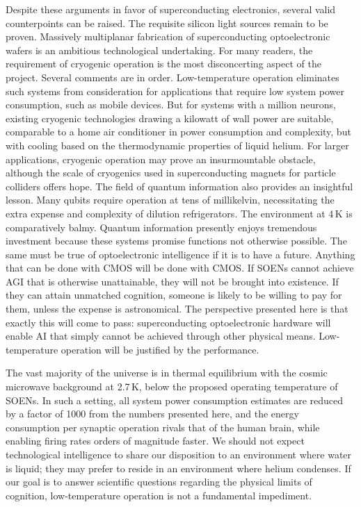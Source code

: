 \documentclass[twocolumn]{article}
\begin{document}
Despite these arguments in favor of superconducting electronics, several valid counterpoints can be raised. The requisite silicon light sources remain to be proven. Massively multiplanar fabrication of superconducting optoelectronic wafers is an ambitious technological undertaking. For many readers, the requirement of cryogenic operation is the most disconcerting aspect of the project. Several comments are in order. Low-temperature operation eliminates such systems from consideration for applications that require low system power consumption, such as mobile devices. But for systems with a million neurons, existing cryogenic technologies drawing a kilowatt of wall power are suitable, comparable to a home air conditioner in power consumption and complexity, but with cooling based on the thermodynamic properties of liquid helium. For larger applications, cryogenic operation may prove an insurmountable obstacle, although the scale of cryogenics used in superconducting magnets for particle colliders offers hope. The field of quantum information also provides an insightful lesson. Many qubits require operation at tens of millikelvin, necessitating the extra expense and complexity of dilution refrigerators. The environment at 4\,K is comparatively balmy. Quantum information presently enjoys tremendous investment because these systems promise functions not otherwise possible. The same must be true of optoelectronic intelligence if it is to have a future. Anything that can be done with CMOS will be done with CMOS. If SOENs cannot achieve AGI that is otherwise unattainable, they will not be brought into existence. If they can attain unmatched cognition, someone is likely to be willing to pay for them, unless the expense is astronomical. The perspective presented here is that exactly this will come to pass: superconducting optoelectronic hardware will enable AI that simply cannot be achieved through other physical means. Low-temperature operation will be justified by the performance.

The vast majority of the universe is in thermal equilibrium with the cosmic microwave background at 2.7\,K, below the proposed operating temperature of SOENs. In such a setting, all system power consumption estimates are reduced by a factor of 1000 from the numbers presented here, and the energy consumption per synaptic operation rivals that of the human brain, while enabling firing rates orders of magnitude faster. We should not expect technological intelligence to share our disposition to an environment where water is liquid; they may prefer to reside in an environment where helium condenses. If our goal is to answer scientific questions regarding the physical limits of cognition, low-temperature operation is not a fundamental impediment.
\end{document}

